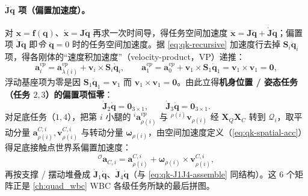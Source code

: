 \paragraph{$\dot{\mathbf{J}}\dot{\boldsymbol{q}}$ 项（偏置加速度）。}
对 $\boldsymbol{x}=\boldsymbol{f}(\boldsymbol{q})$、$\dot{\boldsymbol{x}}=\mathbf{J}\dot{\boldsymbol{q}}$ 再求一次时间导，得任务空间加速度 $\ddot{\boldsymbol{x}}=\mathbf{J}\ddot{\boldsymbol{q}}+\dot{\mathbf{J}}\dot{\boldsymbol{q}}$；偏置项 $\dot{\mathbf{J}}\dot{\boldsymbol{q}}$ 即\emph{令 $\ddot{\boldsymbol{q}}=0$} 时的任务空间加速度。据 \cref{eq:qk-recursive} 加速度行去掉 $\mathbf{S}_i\ddot{\boldsymbol{q}}_i$ 项，得各刚体的“速度积加速度”（velocity-product，VP）递推\cite{yu2021quadruped}：
\begin{equation}
  \boldsymbol{a}_i^{vp}=\boldsymbol{a}_{\lambda(i)}^{vp}+\boldsymbol{v}_i\times\mathbf{S}_i\dot{\boldsymbol{q}}_i,
  \qquad \boldsymbol{a}_1^{vp}=\boldsymbol{a}_0^{vp}+\boldsymbol{v}_1\times\mathbf{S}_1\dot{\boldsymbol{q}}_1=\boldsymbol{v}_1\times\boldsymbol{v}_1=\mathbf{0},
  \label{eq:qk-Jdot-q}
\end{equation}
浮动基座项为零是因 $\mathbf{S}_1\dot{\boldsymbol{q}}_1=\boldsymbol{v}_1$ 而 $\boldsymbol{v}_1\times\boldsymbol{v}_1=\mathbf{0}$。由此立得\textbf{机身位置 / 姿态任务（任务 $2,3$）的偏置项恒零}\cite{yu2021quadruped}：
\begin{equation}
  \dot{\mathbf{J}}_2\dot{\boldsymbol{q}}=\mathbf{0}_{3\times1},
  \qquad
  \dot{\mathbf{J}}_3\dot{\boldsymbol{q}}=\mathbf{0}_{3\times1}.
  \label{eq:qk-J23-zero}
\end{equation}
对足底任务（$1,4$），把第 $i$ 小腿的 ${}^{i}\boldsymbol{a}_{\rho(i)}^{vp}$ 与 ${}^{\rho(i)}\boldsymbol{v}_{\rho(i)}$ 经 $\mathbf{X}_Q\mathbf{X}_C$ 转到 $\mathcal{Q}_i$，取平动分量 $\boldsymbol{a}_{\rho(i)}^{C,i},\boldsymbol{v}_{\rho(i)}^{C,i}$ 与转动分量 $\boldsymbol{\omega}_{\rho(i)}$，由空间加速度定义（\cref{eq:qk-spatial-acc}）得足底接触点世界系偏置加速度\cite{yu2021quadruped}：
\begin{equation}
  {}^{\mathcal{O}}\boldsymbol{a}_{C,i}=\boldsymbol{a}_{\rho(i)}^{C,i}+\boldsymbol{\omega}_{\rho(i)}\times\boldsymbol{v}_{\rho(i)}^{C,i},
  \label{eq:qk-foot-bias-acc}
\end{equation}
再按支撑 / 摆动堆叠成 $\dot{\mathbf{J}}_1\dot{\boldsymbol{q}}$、$\dot{\mathbf{J}}_4\dot{\boldsymbol{q}}$（与 \cref{eq:qk-J1J4-assemble} 同结构）。这 $6$ 个矩阵正是 \cref{ch:quad_wbc} WBC 各级任务所缺的最后拼图。

